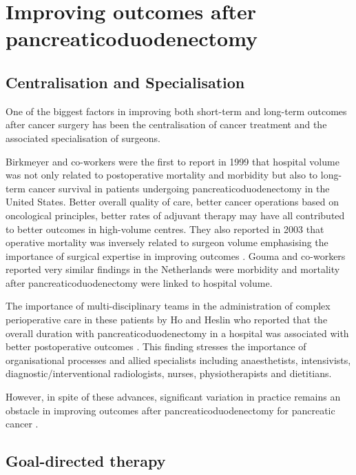\section{Improving outcomes after pancreaticoduodenectomy}

\subsection{Centralisation and Specialisation}

One of the biggest factors in improving both short-term and long-term outcomes after cancer surgery has been the centralisation of cancer treatment and the associated specialisation of surgeons. 

Birkmeyer and co-workers were the first to report in 1999 that hospital volume was not only related to postoperative mortality and morbidity but also to long-term cancer survival in patients undergoing pancreaticoduodenectomy in the United States\parencite{birkmeyer_relationship_1999}.
Better overall quality of care, better cancer operations based on oncological principles, better rates of adjuvant therapy may have all contributed to better outcomes in high-volume centres. 
They also reported in 2003 that operative mortality was inversely related to surgeon volume emphasising the importance of surgical expertise in improving outcomes \parencite{birkmeyer_surgeon_2003}.
Gouma and co-workers reported very similar findings in the Netherlands were morbidity and mortality after pancreaticoduodenectomy were linked to hospital volume\parencite{gouma_rates_2000}.

The importance of multi-disciplinary teams in the administration of complex perioperative care in these patients by Ho and Heslin who reported that the overall duration with pancreaticoduodenectomy in a hospital was associated with better postoperative outcomes \parencite{ho_effect_2003}.
This finding stresses the importance of organisational processes and allied specialists including anaesthetists, intensivists, diagnostic/interventional radiologists, nurses, physiotherapists and dietitians.

However, in spite of these advances, significant variation in practice remains an obstacle in improving outcomes after pancreaticoduodenectomy for pancreatic cancer \parencite{cyr_canadian_2015}.

\subsection{Goal-directed therapy}

